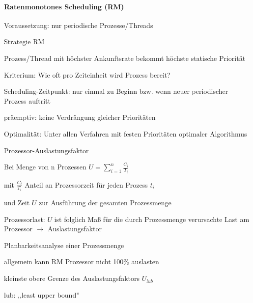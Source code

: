 \documentclass[a4paper]{article}
\begin{document}
\begin{multicols}{3}
    \paragraph{Ratenmonotones Scheduling (RM)}
    \begin{itemize*}
        \item Voraussetzung: nur periodische Prozesse/Threads
        \item Strategie RM
        \begin{itemize*}
            \item Prozess/Thread mit höchster Ankunftsrate bekommt höchste statische Priorität
            \item Kriterium: Wie oft pro Zeiteinheit wird Prozess bereit?
            \item Scheduling-Zeitpunkt: nur einmal zu Beginn bzw. wenn neuer periodischer Prozess auftritt
            \item präemptiv: keine Verdrängung gleicher Prioritäten
        \end{itemize*}
        \item Optimalität: Unter allen Verfahren mit festen Prioritäten optimaler Algorithmus%
        \item Prozessor-Auslastungsfaktor
        \begin{itemize*}
            \item Bei Menge von n Prozessen $U=\sum_{i=1}^n \frac{C_i}{T_i}$
            \item mit $\frac{C_i}{T_i}$ Anteil an Prozessorzeit für jeden Prozess $t_i$
            \item und Zeit $U$ zur Ausführung der gesamten Prozessmenge
        \end{itemize*}
        \item Prozessorlast: $U$ ist folglich Maß für die durch Prozessmenge verursachte Last am Prozessor $\rightarrow$ Auslastungsfaktor
        \item Planbarkeitsanalyse einer Prozessmenge
        \begin{itemize*}
            \item allgemein kann RM Prozessor nicht 100\% auslasten
            \item kleinste obere Grenze des Auslastungsfaktors $U_{lub}$
            \item lub: ,,least upper bound''

\end{itemize*}
\end{itemize*}
\end{multicols}
\end{document}
